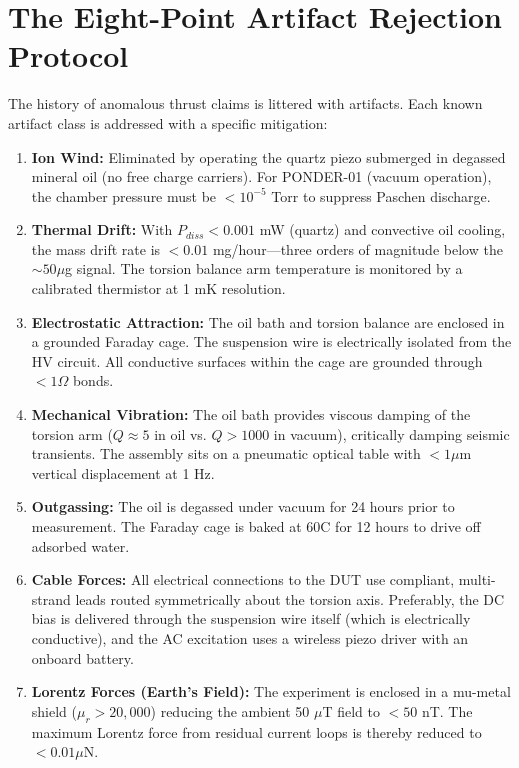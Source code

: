 \section{The Eight-Point Artifact Rejection Protocol}

The history of anomalous thrust claims is littered with artifacts. Each known artifact class is addressed with a specific mitigation:

\begin{enumerate}
    \item \textbf{Ion Wind:} Eliminated by operating the quartz piezo submerged in degassed mineral oil (no free charge carriers). For PONDER-01 (vacuum operation), the chamber pressure must be $< 10^{-5}$ Torr to suppress Paschen discharge.

    \item \textbf{Thermal Drift:} With $P_{diss} < 0.001$ mW (quartz) and convective oil cooling, the mass drift rate is $< 0.01$ mg/hour---three orders of magnitude below the $\sim 50 \mu$g signal. The torsion balance arm temperature is monitored by a calibrated thermistor at 1 mK resolution.

    \item \textbf{Electrostatic Attraction:} The oil bath and torsion balance are enclosed in a grounded Faraday cage. The suspension wire is electrically isolated from the HV circuit. All conductive surfaces within the cage are grounded through $< 1 \Omega$ bonds.

    \item \textbf{Mechanical Vibration:} The oil bath provides viscous damping of the torsion arm ($Q \approx 5$ in oil vs. $Q > 1000$ in vacuum), critically damping seismic transients. The assembly sits on a pneumatic optical table with $< 1 \mu$m vertical displacement at 1 Hz.

    \item \textbf{Outgassing:} The oil is degassed under vacuum for 24 hours prior to measurement. The Faraday cage is baked at 60\textdegree C for 12 hours to drive off adsorbed water.

    \item \textbf{Cable Forces:} All electrical connections to the DUT use compliant, multi-strand leads routed symmetrically about the torsion axis. Preferably, the DC bias is delivered through the suspension wire itself (which is electrically conductive), and the AC excitation uses a wireless piezo driver with an onboard battery.

    \item \textbf{Lorentz Forces (Earth's Field):} The experiment is enclosed in a mu-metal shield ($\mu_r > 20{,}000$) reducing the ambient 50 $\mu$T field to $< 50$ nT. The maximum Lorentz force from residual current loops is thereby reduced to $< 0.01 \mu$N.


\end{enumerate}
